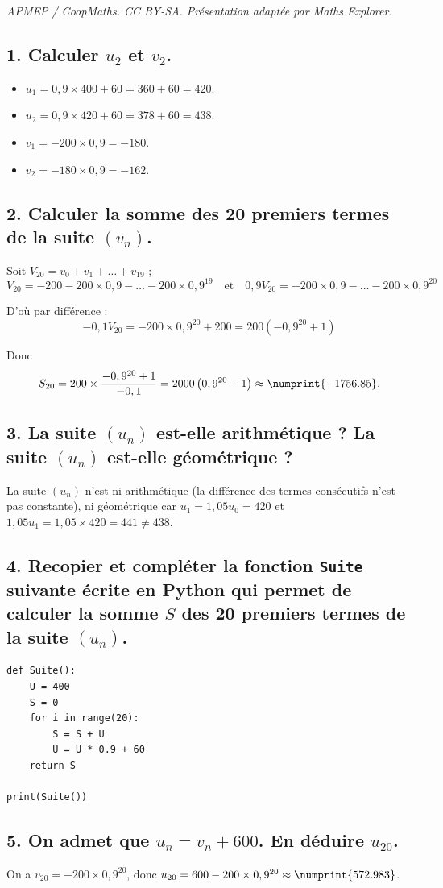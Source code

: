 \documentclass[10pt]{article}
\begin{document}
\noindent\textit{APMEP / CoopMaths. CC BY-SA. Présentation adaptée par Maths Explorer.}\par\medskip
\subsection*{1. Calculer $u_2$ et $v_2$.}
	
	\begin{itemize}
		\item $u_1 = 0,9 \times 400 + 60 = 360 + 60 = 420$.
		\item $u_2 = 0,9 \times 420 + 60 = 378 + 60 = 438$.
		\item $v_1 = -200 \times 0,9 = -180$.
		\item $v_2 = -180 \times 0,9 = -162$.
	\end{itemize}
	
	\subsection*{2. Calculer la somme des 20 premiers termes de la suite $(v_n)$.}
	
	Soit $V_{20} = v_0 + v_1 + \ldots + v_{19}$ ;
	\[
	V_{20} = -200 - 200 \times 0,9 - \ldots - 200 \times 0,9^{19} \quad \text{et} \quad 0,9V_{20} = -200 \times 0,9 - \ldots - 200 \times 0,9^{20}
	\]
	
	D'où par différence :
	\[
	-0,1V_{20} = -200 \times 0,9^{20} + 200 = 200 \left( -0,9^{20} + 1 \right)
	\]
	
	Donc
	\[
	S_{20} = 200 \times \dfrac{-0,9^{20} + 1}{-0,1} = 2000 \left( 0,9^{20} - 1 \right) \approx \numprint{-1756.85}.
	\]
	
	\subsection*{3. La suite $(u_n)$ est-elle arithmétique ? La suite $(u_n)$ est-elle géométrique ?}
	
	La suite $(u_n)$ n'est ni arithmétique (la différence des termes consécutifs n'est pas constante), ni géométrique car $u_1 = 1,05u_0 = 420$ et $1,05u_1 = 1,05 \times 420 = 441 \neq 438$.
	
	\subsection*{4. Recopier et compléter la fonction \texttt{Suite} suivante écrite en Python qui permet de calculer la somme $S$ des 20 premiers termes de la suite $(u_n)$.}
	
	\begin{lstlisting}[style=python]
def Suite():
	U = 400
	S = 0
	for i in range(20):
		S = S + U
		U = U * 0.9 + 60
	return S
		
print(Suite())
	\end{lstlisting}
	
	\subsection*{5. On admet que $u_n = v_n + 600$. En déduire $u_{20}$.}
	
	On a $v_{20} = -200 \times 0,9^{20}$, donc $u_{20} = 600 - 200 \times 0,9^{20} \approx \numprint{572.983}$.
\end{document}
